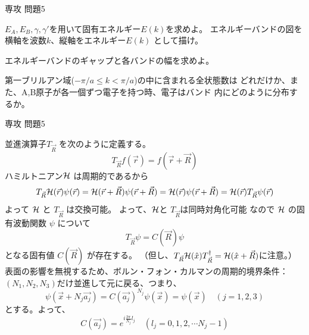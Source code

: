 \documentclass[fleqn]{jbook}
\begin{document}
\begin{question}{専攻 問題5}{}
\begin{subquestions}
\begin{subsubquestions}
  \SubSubQuestion
    $E_A,E_B,\gamma,\gamma'$を用いて固有エネルギー$E(k)$を求めよ。
    エネルギーバンドの図を横軸を波数$k$、縦軸をエネルギー$E(k)$
    として描け。

  \SubSubQuestion
    エネルギーバンドのギャップと各バンドの幅を求めよ。

  \SubSubQuestion
    第一ブリルアン域($-\pi/a\leq k<\pi/a$)の中に含まれる全状態数は
    どれだけか、また、A,B原子が各一個ずつ電子を持つ時、電子はバンド
    内にどのように分布するか。

  \end{subsubquestions}
\end{subquestions}
\end{question}
\begin{answer}{専攻 問題5}{}

\begin{subanswers}
\SubAnswer
  並進演算子$T_{\vec{R}}$ を次のように定義する。
%
  \[ T_{\vec{R}} f(\vec{r}) = f(\vec{r}+\vec{R}) \]
%
  ハミルトニアン${\cal H}$ は周期的であるから
%
  \[ T_{\vec{R}}{\cal H}(\vec{r}) \psi(\vec{r})%
     = {\cal H}(\vec{r}+\vec{R})\psi(\vec{r}+\vec{R})%
     = {\cal H}(\vec{r})\psi(\vec{r}+\vec{R})%
     = {\cal H}(\vec{r})T_{\vec{R}}\psi(\vec{r}) \]
%
  よって ${\cal{H}}$ と $T_{\vec{R}}$ は交換可能。
  よって、${\cal{H}}$と $T_{\vec{R}}$は同時対角化可能 
  なので ${\cal{H}}$ の固有波動関数 $\psi$ について
%
  \[ T_{\vec{R}}\psi=C(\vec{R})\psi \]
%
  となる固有値 $C(\vec{R})$ が存在する。
  （但し、$T_{\vec{R}} {\cal{H}}(\hat{x})T^{\dag}_{\vec{R}} = {\cal{H}}(\hat{x}+\vec{R})$に注意。） \\
%
%
%
%
%
%
  表面の影響を無視するため、ボルン・フォン・カルマンの周期的境界条件：$(N_1,N_2,N_3)$だけ並進して元に戻る、つまり、
 \[ \psi(\vec{x}+N_j\vec{a_j})=C(\vec{a_j})^{N_j}\psi(\vec{x})=\psi(\vec{x})
      \quad (j=1,2,3) \]
とする。よって、
 \[ C(\vec{a_j})=e^{i\frac{2\pi}{N_j}l_j} \quad (l_j=0,1,2,\cdots N_j-1) \]

\end{subanswers}
\end{answer}
\end{document}
